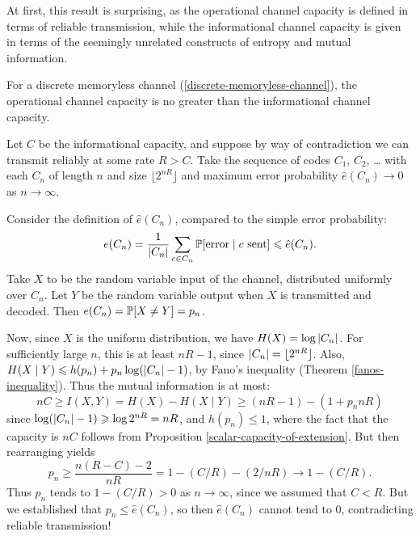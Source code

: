 \documentclass{article}
\begin{document}
At first, this result is surprising, as the operational channel capacity is defined in terms of reliable transmission, while the informational channel capacity is given in terms of the seemingly unrelated constructs of entropy and mutual information.

\begin{proposition}
    For a discrete memoryless channel (\ref{discrete-memoryless-channel}),
    the operational channel capacity
    is no greater than the informational channel capacity.
\end{proposition}
\begin{prf}
    Let $C$ be the informational capacity,
    and suppose by way of contradiction we can transmit reliably at some rate $R > C$.
    Take the sequence of codes $C_1$, $C_2$, \dots
    with each $C_n$ of length $n$ and size $\lfloor 2^{nR} \rfloor$
    and maximum error probability $\hat e(C_n) \to 0$ as $n \to \infty$.
    
    Consider the definition of $\hat e(C_n)$,
    compared to the simple error probability:
    \[
	e(C_n) = \frac{1}{\abs{C_n}} \sum_{c \in C_n} \P[\text{error} \mid c \text{ sent}] \leq \hat e(C_n).
	\]
	Take $X$ to be the random variable input of the channel,
	distributed uniformly over $C_n$.
	Let $Y$ be the random variable output when $X$ is transmitted and decoded.
	Then $e(C_n) = \P[X \neq Y] = p_n$.
	
	Now, since $X$ is the uniform distribution,
	we have $H(X) = \log \abs{C_n}$.
	For sufficiently large $n$, this is at least $nR - 1$,
	since $\abs{C_n} = \lfloor 2^{nR} \rfloor$.
	Also, $H(X \mid Y) \leq h(p_n) + p_n \log(\abs{C_n} - 1)$,
	by Fano's inequality (Theorem \ref{fanos-inequality}).
	Thus the mutual information is at most:
	\[
	nC \geq I(X, Y) = H(X) - H(X \mid Y) \geq (nR-1) - (1 + p_nnR)
	\]
	since $\log(\abs{C_n} - 1) \geq \log 2^{nR} = nR$,
	and $h(p_n) \leq 1$,
	where the fact that the capacity is $nC$ follows from
	Proposition \ref{scalar-capacity-of-extension}.
	But then rearranging yields
	\[
	p_n \geq \frac{n(R-C) - 2}{nR} =
	1 - (C/R) - (2/nR) \to 1 - (C/R).
	\]
	Thus $p_n$ tends to $1-(C/R) > 0$ as $n \to \infty$,
	since we assumed that $C < R$.
	But we established that $p_n \leq \hat e(C_n)$,
	so then $\hat e(C_n)$ cannot tend to 0, contradicting reliable transmission!
\end{prf}
\end{document}
